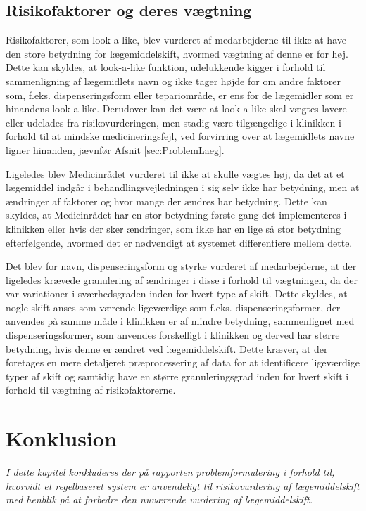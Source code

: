 \section{Risikofaktorer og deres vægtning}
Risikofaktorer, som look-a-like, blev vurderet af medarbejderne til ikke at have den store betydning for lægemiddelskift, hvormed vægtning af denne er for høj. Dette kan skyldes, at look-a-like funktion, udelukkende kigger i forhold til sammenligning af lægemidlets navn og ikke tager højde for om andre faktorer som, f.eks. dispenseringsform eller tepariområde, er ens for de lægemidler som er hinandens look-a-like. Derudover kan det være at look-a-like skal vægtes lavere eller udelades fra risikovurderingen, men stadig være tilgængelige i klinikken i forhold til at mindske medicineringsfejl, ved forvirring over at lægemidlets navne ligner hinanden, jævnfør Afsnit \ref{sec:ProblemLaeg}.

Ligeledes blev Medicinrådet vurderet til ikke at skulle vægtes høj, da det at et lægemiddel indgår i behandlingsvejledningen i sig selv ikke har betydning, men at ændringer af faktorer og hvor mange der ændres har betydning. Dette kan skyldes, at Medicinrådet har en stor betydning første gang det implementeres i klinikken eller hvis der sker ændringer, som ikke har en lige så stor betydning efterfølgende, hvormed det er nødvendigt at systemet differentiere mellem dette.

Det blev for navn, dispenseringsform og styrke vurderet af medarbejderne, at der ligeledes krævede granulering af ændringer i disse i forhold til vægtningen, da der var variationer i sværhedsgraden inden for hvert type af skift. Dette skyldes, at nogle skift anses som værende ligeværdige som f.eks. dispenseringsformer, der anvendes på samme måde i klinikken er af mindre betydning, sammenlignet med dispenseringsformer, som anvendes forskelligt i klinikken og derved har større betydning, hvis denne er ændret ved lægemiddelskift. Dette kræver, at der foretages en mere detaljeret præprocessering af data for at identificere ligeværdige typer af skift og samtidig have en større granuleringsgrad inden for hvert skift i forhold til vægtning af risikofaktorerne.


\chapter{Konklusion}
\textit{I dette kapitel konkluderes der på rapporten problemformulering i forhold til, hvorvidt et regelbaseret system er anvendeligt til risikovurdering af lægemiddelskift med henblik på at forbedre den nuværende vurdering af lægemiddelskift.}

